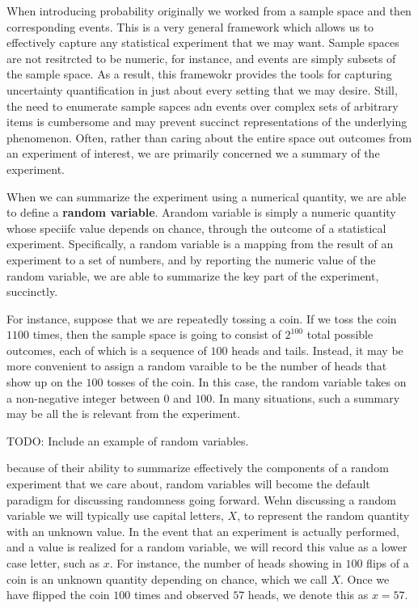 \documentclass[
  letterpaper,
  DIV=11,
  numbers=noendperiod]{scrreprt}
\begin{document}
When introducing probability originally we worked from a sample space
and then corresponding events. This is a very general framework which
allows us to effectively capture any statistical experiment that we may
want. Sample spaces are not resitrcted to be numeric, for instance, and
events are simply subsets of the sample space. As a result, this
framewokr provides the tools for capturing uncertainty quantification in
just about every setting that we may desire. Still, the need to
enumerate sample sapces adn events over complex sets of arbitrary items
is cumbersome and may prevent succinct representations of the underlying
phenomenon. Often, rather than caring about the entire space out
outcomes from an experiment of interest, we are primarily concerned we a
summary of the experiment.

When we can summarize the experiment using a numerical quantity, we are
able to define a \textbf{random variable}. Arandom variable is simply a
numeric quantity whose speciifc value depends on chance, through the
outcome of a statistical experiment. Specifically, a random variable is
a mapping from the result of an experiment to a set of numbers, and by
reporting the numeric value of the random variable, we are able to
summarize the key part of the experiment, succinctly.

For instance, suppose that we are repeatedly tossing a coin. If we toss
the coin \(1100\) times, then the sample space is going to consist of
\(2^{100}\) total possible outcomes, each of which is a sequence of
\(100\) heads and tails. Instead, it may be more convenient to assign a
random varaible to be the number of heads that show up on the \(100\)
tosses of the coin. In this case, the random variable takes on a
non-negative integer between \(0\) and \(100\). In many situations, such
a summary may be all the is relevant from the experiment.

TODO: Include an example of random variables.

because of their ability to summarize effectively the components of a
random experiment that we care about, random variables will become the
default paradigm for discussing randomness going forward. Wehn
discussing a random variable we will typically use capital letters,
\(X\), to represent the random quantity with an unknown value. In the
event that an experiment is actually performed, and a value is realized
for a random variable, we will record this value as a lower case letter,
such as \(x\). For instance, the number of heads showing in \(100\)
flips of a coin is an unknown quantity depending on chance, which we
call \(X\). Once we have flipped the coin \(100\) times and observed
\(57\) heads, we denote this as \(x=57\).
\end{document}
